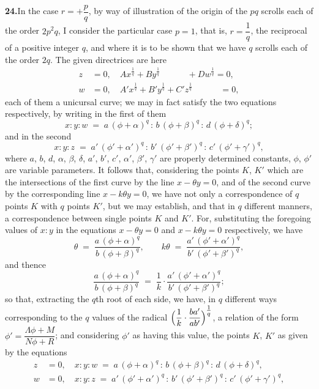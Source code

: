\documentclass[11pt,a4paper]{article}
\begin{document}
\textbf{24.}\quad In the case $r = +\dfrac{p}{q}$, by way of illustration of
the origin of the $pq$ scrolls each of the order $2p^{2}q$, I consider the
particular case $p = 1$, that is, $r = \dfrac{1}{q}$, the reciprocal of a
positive integer $q$, and where it is to be shown that we have $q$ scrolls each
of the order $2q$. The given directrices are here
\begin{align*}
z &= 0, \quad A x^{\tfrac{1}{q}} + B y^{\tfrac{1}{q}}
              \phantom{{} + C'z^{\tfrac{1}{q}}} + D w^{\tfrac{1}{q}} = 0, \\
w &= 0, \quad A' x^{\tfrac{1}{q}} + B' y^{\tfrac{1}{q}} + C' z^{\tfrac{1}{q}}
              \phantom{{} + Dw^{\tfrac{1}{q}}} = 0,
\end{align*}
each of them a unicursal curve; we may in fact satisfy the two equations
respectively, by writing in the first of them
\[
x : y : w \;=\; a\,(\phi + \alpha)^{q} \,:\, b\,(\phi + \beta)^{q}
                \,:\, d\,(\phi + \delta)^{q};
\]
and in the second
\[
x : y : z \;=\; a'\,(\phi' + \alpha')^{q} \,:\, b'\,(\phi' + \beta')^{q}
                \,:\, c'\,(\phi' + \gamma')^{q},
\]
where $a$, $b$, $d$, $\alpha$, $\beta$, $\delta$, $a'$, $b'$, $c'$, $\alpha'$,
$\beta'$, $\gamma'$ are properly determined constants, $\phi$, $\phi'$ are
variable parameters. It follows that, considering the points $K$, $K'$ which
are the intersections of the first curve by the line $x - \theta y = 0$, and
of the second curve by the corresponding line $x - k\theta y = 0$, we have not
only a correspondence of $q$ points $K$ with $q$ points $K'$, but we may
establish, and that in $q$ different manners, a correspondence between single
points $K$ and $K'$. For, substituting the foregoing values of $x : y$ in the
equations $x - \theta y = 0$ and $x - k\theta y = 0$ respectively, we have
\[
\theta \;=\; \frac{a\,(\phi + \alpha)^{q}}{b\,(\phi + \beta)^{q}}, \qquad
k\theta \;=\; \frac{a'\,(\phi' + \alpha')^{q}}{b'\,(\phi' + \beta')^{q}},
\]
and thence
\[
\frac{a\,(\phi + \alpha)^{q}}{b\,(\phi + \beta)^{q}}
\;=\;
\frac{1}{k}\cdot\frac{a'\,(\phi' + \alpha')^{q}}{b'\,(\phi' + \beta')^{q}};
\]
so that, extracting the $q$th root of each side, we have, in $q$ different ways
corresponding to the $q$ values of the radical
$\Bigl(\dfrac{1}{k}\cdot\dfrac{ba'}{ab'}\Bigr)^{\tfrac{1}{q}}$, a relation of
the form $\phi' = \dfrac{\Lambda\phi + M}{N\phi + R}$; and considering $\phi'$
as having this value, the points $K$, $K'$ as given by the equations
\begin{align*}
z &= 0, \quad x : y : w \;=\; a\,(\phi + \alpha)^{q} \,:\,
                              b\,(\phi + \beta)^{q} \,:\,
                              d\,(\phi + \delta)^{q}, \\
w &= 0, \quad x : y : z \;=\; a'\,(\phi' + \alpha')^{q} \,:\,
                              b'\,(\phi' + \beta')^{q} \,:\,
                              c'\,(\phi' + \gamma')^{q},
\end{align*}
\end{document}
